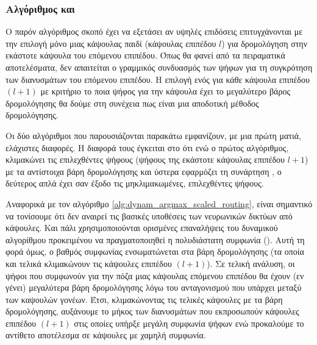 \subsubsection{Αλγόριθμος  και }

Ο παρόν αλγόριθμος σκοπό έχει να εξετάσει αν υψηλές επιδόσεις επιτυγχάνονται με την επιλογή μόνο μιας κάψουλας παιδί (κάψουλας επιπέδου $l$) για δρομολόγηση στην εκάστοτε κάψουλα του επόμενου επιπέδου. Όπως θα φανεί από τα πειραματικά αποτελέσματα, δεν απαιτείται ο γραμμικός συνδυασμός των ψήφων για τη συγκρότηση των διανυσμάτων του επόμενου επιπέδου. Η επιλογή ενός  για κάθε κάψουλα επιπέδου $(l+1)$ με κριτήριο το ποια ψήφος για την κάψουλα έχει το μεγαλύτερο βάρος δρομολόγησης θα δούμε στη συνέχεια πως είναι μια αποδοτική μέθοδος δρομολόγησης.\par

Οι δύο αλγόριθμοι που παρουσιάζονται παρακάτω εμφανίζουν, με μια πρώτη ματιά, ελάχιστες διαφορές. Η διαφορά τους έγκειται στο ότι ενώ ο πρώτος αλγόριθμος, κλιμακώνει τις επιλεχθέντες ψήφους (ψήφους  της εκάστοτε κάψουλας επιπέδου $l+1$) με τα αντίστοιχα βάρη δρομολόγησης και ύστερα εφαρμόζει τη συνάρτηση , ο δεύτερος απλά έχει σαν έξοδο τις μη\textendash κλιμακωμένες, επιλεχθέντες ψήφους. \par

Αναφορικά με τον αλγόριθμο \ref{alg:dynam_argmax_scaled_routing}, είναι σημαντικό να τονίσουμε ότι δεν αναιρεί τις βασικές υποθέσεις των νευρωνικών δικτύων από κάψουλες. Και πάλι χρησιμοποιούνται ορισμένες επαναλήψεις του δυναμικού αλγορίθμου προκειμένου να πραγματοποιηθεί η πολυδιάστατη συμφωνία (). Αυτή τη φορά όμως, ο βαθμός συμφωνίας ενσωματώνεται στα βάρη δρομολόγησης (τα οποία και τελικά κλιμακώνουν τις κάψουλες επιπέδου $(l+1)$). Σε τελική ανάλυση, οι ψήφοι που συμφωνούν για την πόζα μιας κάψουλας επόμενου επιπέδου θα έχουν (εν γένει) μεγαλύτερα βάρη δρομολόγησης λόγω του ανταγονισμού που υπάρχει μεταξύ των καψουλών γονέων. Έτσι, κλιμακώνοντας τις τελικές κάψουλες με τα βάρη δρομολόγησης, αυξάνουμε το μήκος των διανυσμάτων που εκπροσωπούν κάψουλες επιπέδου $(l+1)$ στις οποίες υπήρξε μεγάλη συμφωνία ψήφων ενώ προκαλούμε το αντίθετο αποτέλεσμα σε κάψουλες με χαμηλή συμφωνία.\par

